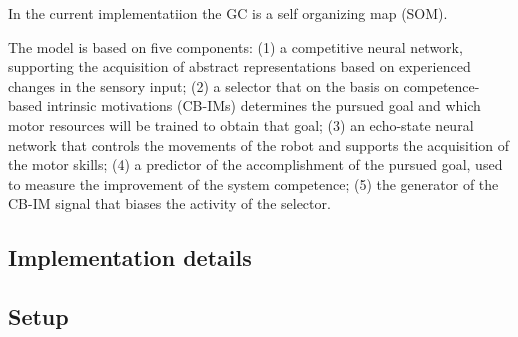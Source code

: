  In the current implementatiion the GC is  a self organizing map (SOM).   

The model is based on five components: (1) a competitive neural network, supporting the acquisition of abstract representations based on experienced changes in the sensory input; (2) a selector that on the basis on competence-based intrinsic motivations (CB-IMs) determines the pursued goal and which motor resources will be trained to obtain that goal; (3) an echo-state neural network that controls the movements of the robot and supports the acquisition of the motor skills; (4) a predictor of the accomplishment of the pursued goal, used to measure the improvement of the system competence; (5) the generator of the CB-IM signal that biases the activity of the selector.
 
\subsection{Implementation details}
\label{sec:Implementation}

\subsection{Setup}
\label{sec:Setup}